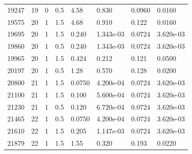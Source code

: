\documentclass[preview]{standalone}
\begin{document}
{{{\begin{tabular}{L{1.2cm}C{1.2cm} C{0.3cm}C{0.5cm} C{1.4cm}C{1.4cm} C{1.4cm}C{1.4cm}}
  19247  &    19  & 0     & 0.5 &  4.58  & 0.830  & 0.0960 &  0.0160   \\ 
  19575  &    20  & 1     & 1.5 &  4.68  & 0.910  & 0.122 &  0.0160   \\ 
  19695  &    20  & 1     & 1.5 &  0.240  & 1.343e-03  & 0.0724 &  3.620e-03   \\ 
  19860  &    20  & 1     & 0.5 &  0.240  & 1.343e-03  & 0.0724 &  3.620e-03   \\ 
  19965  &    20  & 1     & 1.5 &  0.424  & 0.212  & 0.121 &  0.0500   \\ 
  20197  &    20  & 1     & 0.5 &  1.28  & 0.570  & 0.128 &  0.0200   \\ 
  20800  &    21  & 1     & 1.5 &  0.0750  & 4.200e-04  & 0.0724 &  3.620e-03   \\ 
  21100  &    21  & 1     & 1.5 &  0.100  & 5.600e-04  & 0.0724 &  3.620e-03   \\ 
  21230  &    21  & 1     & 0.5 &  0.120  & 6.720e-04  & 0.0724 &  3.620e-03   \\ 
  21465  &    22  & 1     & 0.5 &  0.0750  & 4.200e-04  & 0.0724 &  3.620e-03   \\ 
  21610  &    22  & 1     & 1.5 &  0.205  & 1.147e-03  & 0.0724 &  3.620e-03   \\ 
  21879  &    22  & 1     & 1.5 &  1.55  & 0.320  & 0.193 &  0.0220   \\ 
\hline 
\end{tabular} 

}}}
\end{document}
